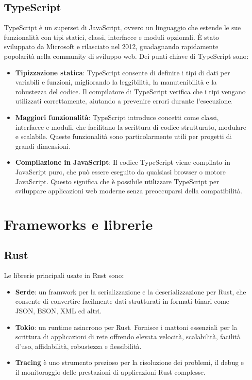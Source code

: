\documentclass[target=bach,aauheader=,style=]{thud}
\begin{document}
\subsection{TypeScript}
TypeScript è un superset di JavaScript, ovvero un linguaggio che estende le sue funzionalità con tipi statici, classi, interfacce e moduli opzionali. È stato sviluppato da Microsoft e rilasciato nel 2012, guadagnando rapidamente popolarità nella community di sviluppo web.
Dei punti chiave di TypeScript sono:

\begin{itemize}
  \item \textbf{Tipizzazione statica}: TypeScript consente di definire i tipi di dati per variabili e funzioni, migliorando la leggibilità, la manutenibilità e la robustezza del codice. Il compilatore di TypeScript verifica che i tipi vengano utilizzati correttamente, aiutando a prevenire errori durante l'esecuzione.
  \item \textbf{Maggiori funzionalità}: TypeScript introduce concetti come classi, interfacce e moduli, che facilitano la scrittura di codice strutturato, modulare e scalabile. Queste funzionalità sono particolarmente utili per progetti di grandi dimensioni.
  \item \textbf{Compilazione in JavaScript}: Il codice TypeScript viene compilato in JavaScript puro, che può essere eseguito da qualsiasi browser o motore JavaScript. Questo significa che è possibile utilizzare TypeScript per sviluppare applicazioni web moderne senza preoccuparsi della compatibilità.
\end{itemize}


\section{Frameworks e librerie}
\subsection{Rust}
Le librerie principali usate in Rust sono:
\begin{itemize}
  \item \textbf{Serde}: un framwork per la serializzazione e la deserializzazione per Rust, che consente di convertire facilmente dati strutturati in formati binari come JSON, BSON, XML ed altri. 
  \item \textbf{Tokio}: un runtime asincrono per Rust. Fornisce i mattoni essenziali per la scrittura di applicazioni di rete offrendo elevata velocità, scalabilità, facilità d'uso, affidabilità, robustezza e flessibilità.
  \item \textbf{Tracing} è uno strumento prezioso per la risoluzione dei problemi, il debug e il monitoraggio delle prestazioni di applicazioni Rust complesse.
\end{itemize}
\end{document}
